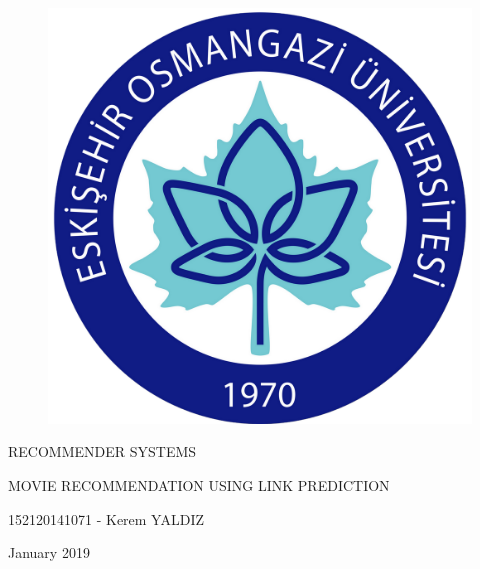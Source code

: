 \begin{titlepage}
	\centering
	\begin{figure}[h!]
        \centering
        \includegraphics[width=0.59\linewidth]{images/logo.png}
    \end{figure}
    
    \vspace{1.5cm}
	{\Large RECOMMENDER SYSTEMS\par}
	\vspace{1cm}
	{\Large MOVIE RECOMMENDATION USING LINK PREDICTION\par}
	\vfill
	{\large 152120141071 - Kerem YALDIZ}
	\vfill

	{\large January 2019\par}
\end{titlepage}

\clearpage